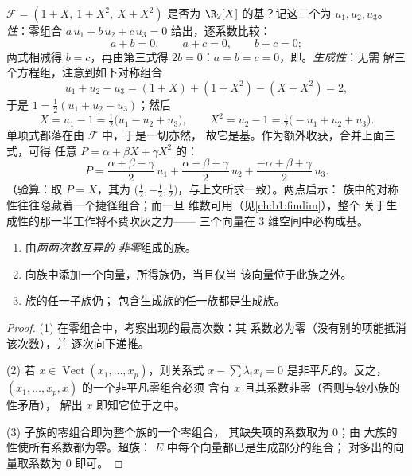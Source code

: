 \begin{example}
\label{ex:b1:vspaces:testbasis}
$\mathcal{F} = (1 + X,\ 1 + X^2,\ X + X^2)$ 是否为
$\R_2[X]$ 的基？记这三个为 $u_1, u_2, u_3$。
\emph{性}：零组合 $a\,u_1 + b\,u_2 + c\,u_3 =
0$ 给出，逐系数比较：
\[
a + b = 0, \qquad a + c = 0, \qquad b + c = 0 ;
\]
两式相减得 $b = c$，再由第三式得 $2b =
0$：$a = b = c = 0$，即。\emph{生成性}：无需
解三个方程组，注意到如下对称组合
\[
u_1 + u_2 - u_3 = (1 + X) + (1 + X^2) - (X + X^2) = 2 ,
\]
于是 $1 = \frac12(u_1 + u_2 - u_3)$；然后
\[
X = u_1 - 1 = \tfrac12\bigl(u_1 - u_2 + u_3\bigr),
\qquad
X^2 = u_2 - 1 = \tfrac12\bigl(-u_1 + u_2 + u_3\bigr).
\]
单项式都落在由 $\mathcal{F}$ 中，于是一切亦然，
故它是基。作为额外收获，合并上面三式，可得
任意 $P = \alpha + \beta X + \gamma X^2$ 的：
\[
P = \frac{\alpha + \beta - \gamma}{2}\,u_1
+ \frac{\alpha - \beta + \gamma}{2}\,u_2
+ \frac{-\alpha + \beta + \gamma}{2}\,u_3 .
\]
（验算：取 $P = X$，其为 $\bigl(\frac12,
-\frac12, \frac12\bigr)$，与上文所求一致）。两点启示：
族中的对称性往往隐藏着一个捷径组合；而一旦
维数可用（见\cref{ch:b1:findim}），整个
关于生成性的那一半工作将不费吹灰之力——
三个向量在 $3$ 维空间中必构成基。
\end{example}

\begin{proposition}[实用的线性无关判别准则]\label{prop:b1:vspaces:freecriteria}
\begin{enumerate}
  \item 由\emph{两两次数互异的
        非零}组成的族。
  \item 向族中添加一个向量，所得族仍，当且仅当
        该向量位于此族之外。
  \item {}族的任一子族仍；
        包含生成族的任一族都是生成族。
\end{enumerate}
\end{proposition}

\begin{proof}
(1) 在零组合中，考察出现的最高次数：其
系数必为零（没有别的项能抵消该次数），并
逐次向下递推。

(2) 若 $x \in \operatorname{Vect}(x_1, \dots, x_p)$，则关系式 $x
- \sum\lambda_i x_i = 0$ 是非平凡的。反之，
$(x_1, \dots, x_p, x)$ 的一个非平凡零组合必须
含有 $x$ 且其系数非零（否则与较小族的性矛盾），
解出 $x$ 即知它位于之中。

(3) 子族的零组合即为整个族的一个零组合，
其缺失项的系数取为 $0$；由
大族的性使所有系数都为零。超族：
$E$ 中每个向量都已是生成部分的组合；
对多出的向量取系数为 $0$ 即可。
\end{proof}

